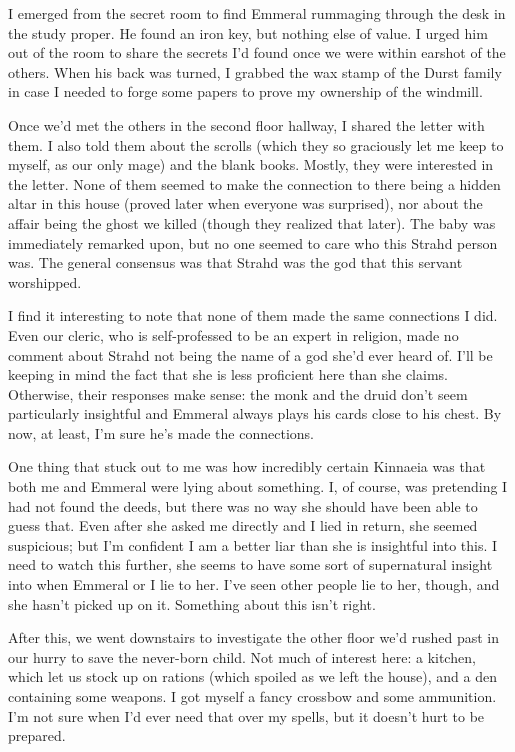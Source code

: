 I emerged from the secret room to find Emmeral rummaging through the desk in the study proper. He found an iron key, but nothing else of value. I urged him out of the room to share the secrets I'd found once we were within earshot of the others. When his back was turned, I grabbed the wax stamp of the Durst family in case I needed to forge some papers to prove my ownership of the windmill.

Once we'd met the others in the second floor hallway, I shared the letter with them. I also told them about the scrolls (which they so graciously let me keep to myself, as our only mage) and the blank books. Mostly, they were interested in the letter. None of them seemed to make the connection to there being a hidden altar in this house (proved later when everyone was surprised), nor about the affair being the ghost we killed (though they realized that later). The baby was immediately remarked upon, but no one seemed to care who this Strahd person was. The general consensus was that Strahd was the god that this servant worshipped.

I find it interesting to note that none of them made the same connections I did. Even our cleric, who is self-professed to be an expert in religion, made no comment about Strahd not being the name of a god she'd ever heard of. I'll be keeping in mind the fact that she is less proficient here than she claims. Otherwise, their responses make sense: the monk and the druid don't seem particularly insightful and Emmeral always plays his cards close to his chest. By now, at least, I'm sure he's made the connections.

One thing that stuck out to me was how incredibly certain Kinnaeia was that both me and Emmeral were lying about something. I, of course, was pretending I had not found the deeds, but there was no way she should have been able to guess that. Even after she asked me directly and I lied in return, she seemed suspicious; but I'm confident I am a better liar than she is insightful into this. I need to watch this further, she seems to have some sort of supernatural insight into when Emmeral or I lie to her. I've seen other people lie to her, though, and she hasn't picked up on it. Something about this isn't right.

After this, we went downstairs to investigate the other floor we'd rushed past in our hurry to save the never-born child. Not much of interest here: a kitchen, which let us stock up on rations (which spoiled as we left the house), and a den containing some weapons. I got myself a fancy crossbow and some ammunition. I'm not sure when I'd ever need that over my spells, but it doesn't hurt to be prepared.

